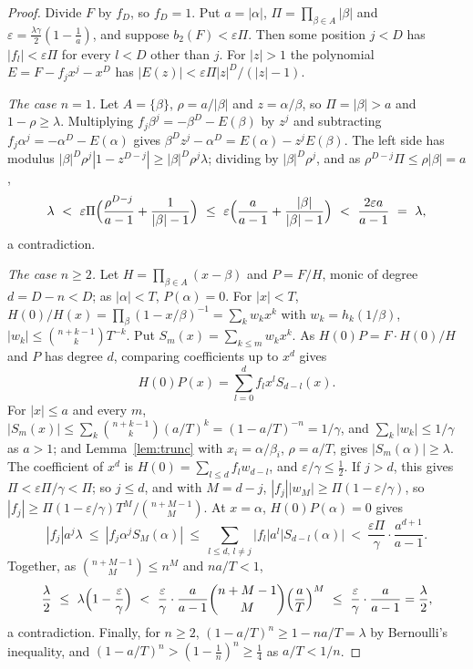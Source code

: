 \documentclass[11pt]{article}
\begin{document}
\begin{proof}
Divide $F$ by $f_D$, so $f_D=1$.  Put $a=|\alpha|$,
$\Pi=\prod_{\beta\in A}|\beta|$ and
$\varepsilon=\frac{\lambda\gamma}2(1-\frac1a)$, and suppose
$b_2(F)<\varepsilon\Pi$.  Then some position $j<D$ has $|f_l|<\varepsilon\Pi$
for every $l<D$ other than $j$.  For $|z|>1$ the polynomial
$E=F-f_jx^j-x^D$ has $|E(z)|<\varepsilon\Pi|z|^D/(|z|-1)$.

\emph{The case $n=1$.}  Let $A=\{\beta\}$, $\rho=a/|\beta|$ and
$z=\alpha/\beta$, so $\Pi=|\beta|>a$ and $1-\rho\ge\lambda$.  Multiplying
$f_j\beta^j=-\beta^D-E(\beta)$ by $z^j$ and subtracting
$f_j\alpha^j=-\alpha^D-E(\alpha)$ gives
$\beta^Dz^j-\alpha^D=E(\alpha)-z^jE(\beta)$.  The left side has modulus
$|\beta|^D\rho^j|1-z^{D-j}|\ge|\beta|^D\rho^j\lambda$; dividing by
$|\beta|^D\rho^j$, and as $\rho^{D-j}\Pi\le\rho|\beta|=a$,
\[
  \lambda\ <\ \varepsilon\Pi\Bigl(\frac{\rho^{D-j}}{a-1}+\frac1{|\beta|-1}\Bigr)
  \ \le\ \varepsilon\Bigl(\frac a{a-1}+\frac{|\beta|}{|\beta|-1}\Bigr)
  \ <\ \frac{2\varepsilon a}{a-1}\ =\ \lambda ,
\]
a contradiction.

\emph{The case $n\ge2$.}  Let $H=\prod_{\beta\in A}(x-\beta)$ and $P=F/H$,
monic of degree $d=D-n<D$; as $|\alpha|<T$, $P(\alpha)=0$.  For $|x|<T$,
$H(0)/H(x)=\prod_\beta(1-x/\beta)^{-1}=\sum_kw_kx^k$ with
$w_k=h_k(1/\beta)$, $|w_k|\le\binom{n+k-1}kT^{-k}$.  Put
$S_m(x)=\sum_{k\le m}w_kx^k$.  As $H(0)P=F\cdot H(0)/H$ and $P$ has degree
$d$, comparing coefficients up to $x^d$ gives
\[
  H(0)P(x)=\sum_{l=0}^df_lx^lS_{d-l}(x).
\]
For $|x|\le a$ and every $m$,
$|S_m(x)|\le\sum_k\binom{n+k-1}k(a/T)^k=(1-a/T)^{-n}=1/\gamma$, and
$\sum_k|w_k|\le1/\gamma$ as $a>1$; and Lemma~\ref{lem:trunc} with
$x_i=\alpha/\beta_i$, $\rho=a/T$, gives $|S_m(\alpha)|\ge\lambda$.
The coefficient of $x^d$ is $H(0)=\sum_{l\le d}f_lw_{d-l}$, and
$\varepsilon/\gamma\le\frac12$.  If $j>d$, this gives
$\Pi<\varepsilon\Pi/\gamma<\Pi$; so $j\le d$, and with $M=d-j$,
$|f_j||w_M|\ge\Pi(1-\varepsilon/\gamma)$, so
$|f_j|\ge\Pi(1-\varepsilon/\gamma)T^M/\binom{n+M-1}M$.  At $x=\alpha$,
$H(0)P(\alpha)=0$ gives
\[
  |f_j|a^j\lambda\ \le\ |f_j\alpha^jS_M(\alpha)|\ \le\ \sum_{l\le d,\,l\ne j}|f_l|a^l|S_{d-l}(\alpha)|
  \ <\ \frac{\varepsilon\Pi}\gamma\cdot\frac{a^{d+1}}{a-1} .
\]
Together, as $\binom{n+M-1}M\le n^M$ and $na/T<1$,
\[
  \frac\lambda2\ \le\ \lambda\Bigl(1-\frac\varepsilon\gamma\Bigr)
  \ <\ \frac\varepsilon\gamma\cdot\frac a{a-1}\binom{n+M-1}M\Bigl(\frac aT\Bigr)^M
  \ \le\ \frac\varepsilon\gamma\cdot\frac a{a-1}=\frac\lambda2 ,
\]
a contradiction.  Finally, for $n\ge2$, $(1-a/T)^n\ge1-na/T=\lambda$ by
Bernoulli's inequality, and $(1-a/T)^n>(1-\frac1n)^n\ge\frac14$ as $a/T<1/n$.
\end{proof}
\end{document}

